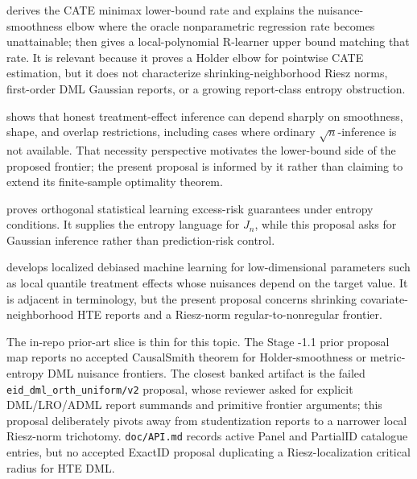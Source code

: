 \documentclass[11pt]{article}
\theoremstyle{definition}
\theoremstyle{plain}
\theoremstyle{remark}
\begin{document}
\citet[Theorem~1 and Section~3.3]{KennedyBalakrishnanRobinsWasserman2024MinimaxCATE}
derives the CATE minimax lower-bound rate and explains the nuisance-smoothness
elbow where the oracle nonparametric regression rate becomes unattainable;
\citet[Theorem~2 and Section~4.1]{KennedyBalakrishnanRobinsWasserman2024MinimaxCATE}
then gives a local-polynomial R-learner upper bound matching that rate.  It is
relevant because it proves a Holder elbow for pointwise CATE estimation, but
it does not characterize shrinking-neighborhood Riesz norms, first-order DML
Gaussian reports, or a growing report-class entropy obstruction.

\citet[abstract and Sections~2--3]{ArmstrongKolesar2021FiniteSampleATE} shows
that honest treatment-effect inference can depend sharply on smoothness,
shape, and overlap restrictions, including cases where ordinary
\(\sqrt n\)-inference is not available.  That necessity perspective motivates
the lower-bound side of the proposed frontier; the present proposal is informed
by it rather than claiming to extend its finite-sample optimality theorem.

\citet{FosterSyrgkanis2023OSL} proves orthogonal statistical learning
excess-risk guarantees under entropy conditions.  It supplies the entropy
language for \(J_n\), while this proposal asks for Gaussian inference rather
than prediction-risk control.

\citet{KallusMaoUehara2024LDML} develops localized debiased machine learning
for low-dimensional parameters such as local quantile treatment effects whose
nuisances depend on the target value.  It is adjacent in terminology, but the
present proposal concerns shrinking covariate-neighborhood HTE reports and a
Riesz-norm regular-to-nonregular frontier.

The in-repo prior-art slice is thin for this topic.  The Stage -1.1 prior
proposal map reports no accepted CausalSmith theorem for Holder-smoothness or
metric-entropy DML nuisance frontiers.  The closest banked artifact is the
failed \texttt{eid\_dml\_orth\_uniform/v2} proposal, whose reviewer asked for
explicit DML/LRO/ADML report summands and primitive frontier arguments; this
proposal deliberately pivots away from studentization reports to a narrower
local Riesz-norm trichotomy.  \texttt{doc/API.md} records active Panel and
PartialID catalogue entries, but no accepted ExactID proposal duplicating a
Riesz-localization critical radius for HTE DML.
\end{document}
